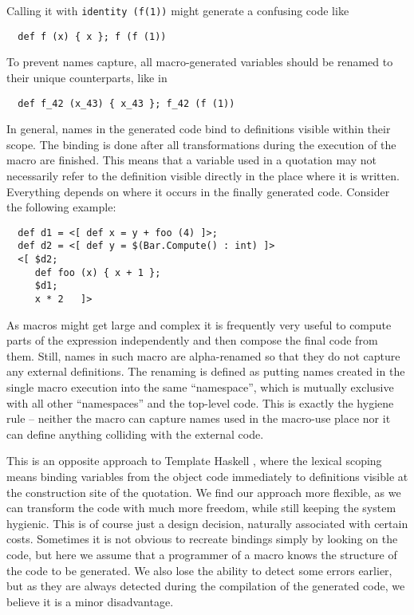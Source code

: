 \documentclass{llncs}
\begin{document}
Calling it with \verb,identity (f(1)), might generate a confusing code like

\begin{verbatim}
  def f (x) { x }; f (f (1))
\end{verbatim}

To prevent names capture, all macro-generated variables should be renamed 
to their unique counterparts, like in

\begin{verbatim}
  def f_42 (x_43) { x_43 }; f_42 (f (1))
\end{verbatim}

In general, names in the generated code bind to definitions visible within 
their scope. The binding is done after all transformations during the execution
of the macro are finished. This means that a variable used in a quotation 
may not necessarily refer to the definition visible directly in the place 
where it is written. Everything depends on where it occurs in the finally 
generated code. Consider the following example:

\begin{verbatim}
  def d1 = <[ def x = y + foo (4) ]>;
  def d2 = <[ def y = $(Bar.Compute() : int) ]>
  <[ $d2;
     def foo (x) { x + 1 };
     $d1;
     x * 2   ]>
\end{verbatim}       %

As macros might get large and complex it is frequently very useful to compute
parts of the expression independently and then compose the final code from them.
Still, names in such macro are alpha-renamed so that they do not capture any 
external definitions. The renaming is defined as putting names created 
in the single macro execution into the same ``namespace'', which is
mutually exclusive with all other ``namespaces'' and the top-level code.
This is exactly the hygiene rule -- neither the macro can capture names
used in the macro-use place nor it can define anything colliding with the 
external code. 

This is an opposite approach to Template Haskell \cite{Haskell:Meta}, 
where the lexical scoping means binding variables from the object code immediately 
to definitions visible at the construction site of the quotation.
We find our approach more flexible, as we can transform the code with much
more freedom, while still keeping the system hygienic. This is of course just 
a design decision, naturally associated with certain costs. Sometimes it is not 
obvious to recreate bindings simply by looking on the code, but here we assume 
that a programmer of a macro knows the structure of the code to be generated. 
We also lose the ability to detect some errors earlier, but as they are always 
detected during the compilation of the generated code, we believe it is 
a minor disadvantage. 
\end{document}
